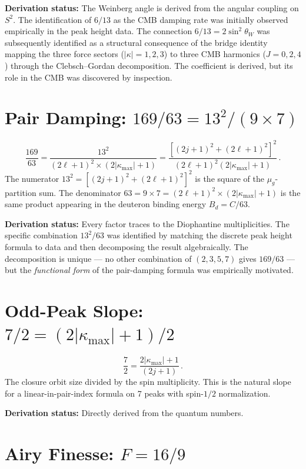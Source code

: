 \documentclass[11pt,letterpaper]{article}
\numberwithin{equation}{section}
\begin{document}
\textbf{Derivation status:} The Weinberg angle is derived from the
angular coupling on $S^2$.  The identification of $6/13$ as the CMB
damping rate was initially observed empirically in the peak height
data.  The connection $6/13 = 2\sin^2\theta_W$ was subsequently
identified as a structural consequence of the bridge identity mapping
the three force sectors ($|\kappa| = 1, 2, 3$) to three CMB harmonics
($J = 0, 2, 4$) through the Clebsch--Gordan decomposition.  The
coefficient is derived, but its role in the CMB was discovered by
inspection.

\section{Pair Damping: $169/63 = 13^2/(9 \times 7)$}

\begin{equation}
  \frac{169}{63} = \frac{13^2}{(2\ell+1)^2 \times (2|\kappa_{\max}|+1)}
  = \frac{[(2j+1)^2 + (2\ell+1)^2]^2}{(2\ell+1)^2(2|\kappa_{\max}|+1)}\,.
\end{equation}
The numerator $13^2 = [(2j+1)^2 + (2\ell+1)^2]^2$ is the square of
the $\mu_g$-partition sum.  The denominator $63 = 9 \times 7 =
(2\ell+1)^2 \times (2|\kappa_{\max}|+1)$ is the same product
appearing in the deuteron binding energy $B_d = C/63$.

\textbf{Derivation status:} Every factor traces to the Diophantine
multiplicities.  The specific combination $13^2/63$ was identified by
matching the discrete peak height formula to data and then
decomposing the result algebraically.  The decomposition is unique ---
no other combination of $(2,3,5,7)$ gives $169/63$ --- but the
\emph{functional form} of the pair-damping formula was empirically
motivated.

\section{Odd-Peak Slope: $7/2 = (2|\kappa_{\max}|+1)/2$}

\begin{equation}
  \frac{7}{2} = \frac{2|\kappa_{\max}|+1}{(2j+1)}\,.
\end{equation}
The closure orbit size divided by the spin multiplicity.  This is the
natural slope for a linear-in-pair-index formula on 7 peaks with
spin-$1/2$ normalization.

\textbf{Derivation status:} Directly derived from the quantum numbers.

\section{Airy Finesse: $F = 16/9$}
\end{document}
